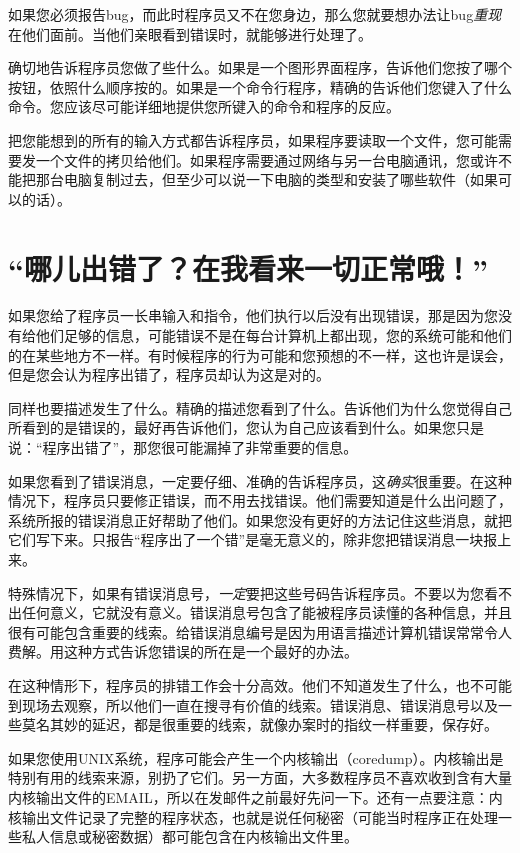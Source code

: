 \documentclass[titlepage]{article}
\begin{document}
如果您必须报告bug，而此时程序员又不在您身边，那么您就要想办法让bug\emph{重现}在他们面前。当他们亲眼看到错误时，就能够进行处理了。

确切地告诉程序员您做了些什么。如果是一个图形界面程序，告诉他们您按了哪个按钮，依照什么顺序按的。如果是一个命令行程序，精确的告诉他们您键入了什么命令。您应该尽可能详细地提供您所键入的命令和程序的反应。

把您能想到的所有的输入方式都告诉程序员，如果程序要读取一个文件，您可能需要发一个文件的拷贝给他们。如果程序需要通过网络与另一台电脑通讯，您或许不能把那台电脑复制过去，但至少可以说一下电脑的类型和安装了哪些软件（如果可以的话）。

\section{{“哪儿出错了？在我看来一切正常哦！”}}

如果您给了程序员一长串输入和指令，他们执行以后没有出现错误，那是因为您没有给他们足够的信息，可能错误不是在每台计算机上都出现，您的系统可能和他们的在某些地方不一样。有时候程序的行为可能和您预想的不一样，这也许是误会，但是您会认为程序出错了，程序员却认为这是对的。

同样也要描述发生了什么。精确的描述您看到了什么。告诉他们为什么您觉得自己所看到的是错误的，最好再告诉他们，您认为自己应该看到什么。如果您只是说：“程序出错了”，那您很可能漏掉了非常重要的信息。

如果您看到了错误消息，一定要仔细、准确的告诉程序员，这\emph{确实}很重要。在这种情况下，程序员只要修正错误，而不用去找错误。他们需要知道是什么出问题了，系统所报的错误消息正好帮助了他们。如果您没有更好的方法记住这些消息，就把它们写下来。只报告“程序出了一个错”是毫无意义的，除非您把错误消息一块报上来。

特殊情况下，如果有错误消息号，\emph{一定}要把这些号码告诉程序员。不要以为您看不出任何意义，它就没有意义。错误消息号包含了能被程序员读懂的各种信息，并且很有可能包含重要的线索。给错误消息编号是因为用语言描述计算机错误常常令人费解。用这种方式告诉您错误的所在是一个最好的办法。

在这种情形下，程序员的排错工作会十分高效。他们不知道发生了什么，也不可能到现场去观察，所以他们一直在搜寻有价值的线索。错误消息、错误消息号以及一些莫名其妙的延迟，都是很重要的线索，就像办案时的指纹一样重要，保存好。

如果您使用UNIX系统，程序可能会产生一个内核输出（coredump）。内核输出是特别有用的线索来源，别扔了它们。另一方面，大多数程序员不喜欢收到含有大量内核输出文件的EMAIL，所以在发邮件之前最好先问一下。还有一点要注意：内核输出文件记录了完整的程序状态，也就是说任何秘密（可能当时程序正在处理一些私人信息或秘密数据）都可能包含在内核输出文件里。
\end{document}
